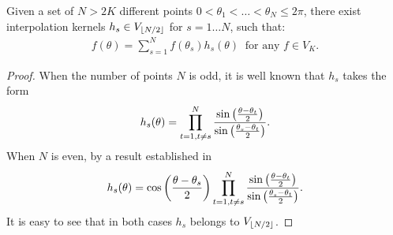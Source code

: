 \begin{lemma}
\label{lemma:VK_interpolation}
  Given a set of $N>2K$ different points $0< \theta_1<\ldots<\theta_N\leq 2\pi$, there exist
  interpolation kernels $h_s\in V_{\lfloor N/2 \rfloor}$ for $s=1\ldots N$, such that:
  \begin{align}
    \label{eq:f_interpl}
    f(\theta) = \sum_{s=1}^{N} f(\theta_s) h_s(\theta) \ \text{ for any } f\in
    V_K.
  \end{align}
\end{lemma}
\begin{proof}
  When the number of points $N$ is odd, it is well known \cite{zygmund_trigonometric_1988}
  that $h_s$ takes the form
  \begin{align}
    \label{eq:hs_odd}
    h_s(\theta) = \prod_{t=1,t\neq
      s}^{N}\frac{\sin\left( \frac{\theta-\theta_t}{2} \right)}{\sin\left( \frac{\theta_s-\theta_t}{2} \right)}.
  \end{align}
  When $N$ is even, by a result established in
 \cite{margolis_nonuniform_2008}
  \begin{align}
    \label{eq:hs_even}
    h_s(\theta) = \cos\left( \frac{\theta-\theta_s}{2} \right)\prod_{t=1,t\neq
      s}^{N}\frac{\sin\left( \frac{\theta-\theta_t}{2} \right)}{\sin\left( \frac{\theta_s-\theta_t}{2} \right)}.
  \end{align}
  It is easy to see that in both cases $h_s$ belongs to $V_{\lfloor N/2 \rfloor}$.
\end{proof}

